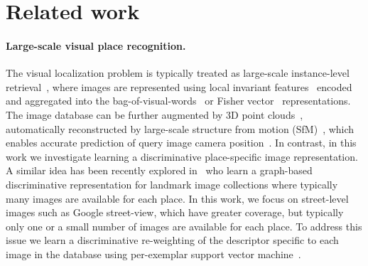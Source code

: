 \section{Related work} 
\label{sec:related}

\paragraph{Large-scale visual place recognition.}
    The visual localization problem is typically treated as large-scale instance-level retrieval~\cite{Cummins09,Chen11,Gronat13,Knopp2010,Schindler07,Torii2013,Zamir10}, where images are represented using local invariant
    features~\cite{Lowe04} encoded and aggregated into the bag-of-visual-words~\cite{Csurka04,Sivic03} or Fisher vector~\cite{Jegou12} representations. 
    The image database can be further augmented by 3D point clouds~\cite{Klinger13}, automatically
    reconstructed by large-scale structure from motion
    (SfM)~\cite{Agarwal-ICCV-2009,Klinger13}, which enables accurate prediction of query image camera position~\cite{Li12,Sattler12}.
    In contrast, in this work we investigate learning a discriminative place-specific image representation. A similar idea has been recently explored in~\cite{Cao13} 
    who learn a graph-based discriminative representation for landmark image collections where typically many images are available for each place.
    In this work, we focus on street-level images such as Google street-view, which have greater coverage, but typically only one or a small number of images are  available for each place.  To address this issue we learn a discriminative re-weighting of the descriptor specific to each image in the database using per-exemplar support vector machine~\cite{Malisiewicz11}.
    
    

